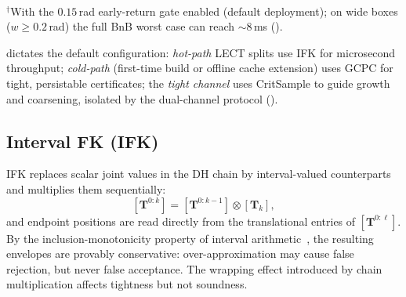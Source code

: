 \documentclass[journal]{IEEEtran}
\begin{document}
\begin{table}[ht]
\centering
\caption{epiAABB source-pipeline characteristics ($D=7$, $L_\text{act}=4$)}
\label{tab:epi_compare}
\\[2pt]
{\scriptsize $^{\dagger}$With the $0.15$\,rad early-return gate enabled
(default deployment); on wide boxes ($w\!\geq\!0.2$\,rad) the full BnB
worst case can reach ${\sim}8$\,ms ().}
\end{table}

 dictates the default configuration:
\emph{hot-path} LECT splits use IFK for microsecond throughput;
\emph{cold-path} (first-time build or offline cache extension) uses GCPC
for tight, persistable certificates; the \emph{tight channel} uses
CritSample to guide growth and coarsening, isolated by the dual-channel
protocol ().

\subsection{Interval FK (IFK)}\label{sec:ifk}

IFK replaces scalar joint values in the DH chain by interval-valued
counterparts and multiplies them sequentially:
\begin{equation}\label{eq:chain}
  [\bm{T}^{0:k}] = [\bm{T}^{0:k-1}] \otimes [\bm{T}_k],
\end{equation}
and endpoint positions are read directly from the translational entries
of $[\bm{T}^{0:\ell}]$. By the inclusion-monotonicity property of
interval arithmetic~\cite{moore2009introduction}, the resulting
envelopes are provably conservative: over-approximation may cause false
rejection, but never false acceptance. The wrapping effect introduced by
chain multiplication affects tightness but not soundness.
\end{document}
